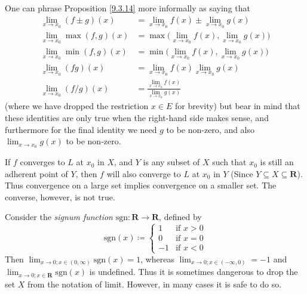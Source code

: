 \begin{remark}\label{9.3.15}
    One can phrase Proposition \ref{9.3.14} more informally as saying that
    \begin{align*}
        \lim_{x \to x_0} (f \pm g)(x)  & = \lim_{x \to x_0} f(x) \pm \lim_{x \to x_0} g(x)              \\
        \lim_{x \to x_0} \max(f, g)(x) & = \max\bigg(\lim_{x \to x_0} f(x), \lim_{x \to x_0} g(x)\bigg) \\
        \lim_{x \to x_0} \min(f, g)(x) & = \min\bigg(\lim_{x \to x_0} f(x), \lim_{x \to x_0} g(x)\bigg) \\
        \lim_{x \to x_0} (fg)(x)       & = \lim_{x \to x_0} f(x) \lim_{x \to x_0} g(x)                  \\
        \lim_{x \to x_0} (f / g)(x)    & = \frac{\lim_{x \to x_0} f(x)}{\lim_{x \to x_0} g(x)}
    \end{align*}
    (where we have dropped the restriction \(x \in E\) for brevity)
    but bear in mind that these identities are only true when the right-hand side makes sense, and furthermore for the final identity we need \(g\) to be non-zero, and also \(\lim_{x \to x_0} g(x)\) to be non-zero.
\end{remark}

\begin{note}
    If \(f\) converges to \(L\) at \(x_0\) in \(X\), and \(Y\) is any subset of \(X\) such that \(x_0\) is still an adherent point of \(Y\), then \(f\) will also converge to \(L\) at \(x_0\) in \(Y\)
    (Since \(Y \subseteq X \subseteq \mathbf{R}\)).
    Thus convergence on a large set implies convergence on a smaller set.
    The converse, however, is not true.
\end{note}

\begin{example}\label{9.3.16}
    Consider the \emph{signum function} \(\text{sgn} : \mathbf{R} \to \mathbf{R}\), defined by
    \[
        \text{sgn}(x) \coloneqq \begin{cases}
            1  & \text{if } x > 0 \\
            0  & \text{if } x = 0 \\
            -1 & \text{if } x < 0
        \end{cases}
    \]
    Then \(\lim_{x \to 0 ; x \in (0, \infty)} \text{sgn}(x) = 1\), whereas \(\lim_{x \to 0 ; x \in (-\infty, 0)} = -1\) and \(\lim_{x \to 0 ; x \in \mathbf{R}} \text{sgn}(x)\) is undefined.
    Thus it is sometimes dangerous to drop the set \(X\) from the notation of limit.
    However, in many cases it is safe to do so.
\end{example}